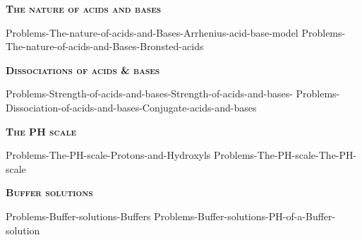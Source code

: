 \documentclass[main.tex]{subfiles}
\newcommand\chapterlabel{Ch-acidbase}
\begin{document}
\newpage
 
\fancyhfoffset[E,O]{0pt}
\setlength{\columnsep}{30pt}
\begin{conclusion}
\end{conclusion}
\begin{multicols*}{2}\setcounter{numA}{1}
{\raggedright\textsc{\textbf{The nature of acids and bases}}\par}
 {Problems-The-nature-of-acids-and-Bases-Arrhenius-acid-base-model}
 {Problems-The-nature-of-acids-and-Bases-Bronsted-acids}
 
 \iftoggle{chem121}{}{
 {Problems-The-nature-of-acids-and-Bases-Lewis-acid-base-model}
}
{\raggedright\textsc{\textbf{Dissociations of acids \& bases}}\par}
 {Problems-Strength-of-acids-and-bases-Strength-of-acids-and-bases-}
 {Problems-Dissociation-of-acids-and-bases-Conjugate-acids-and-bases}
 
{\raggedright\textsc{\textbf{The PH scale}}\par}
 {Problems-The-PH-scale-Protons-and-Hydroxyls}
 {Problems-The-PH-scale-The-PH-scale}
 
 \iftoggle{chem121}{}{
  {\raggedright\textsc{\textbf{PH of strong acid-base solutions}}\par}
 {Problems-The-PH-scale-PH-of-strong-electrolyte-solutions} 

 
 {\raggedright\textsc{\textbf{PH of weak acid-base solutions}}\par}
 {Problems-The-PH-scale-PH-of-solutions-of-weak-acids-and-bases} 
 {Problems-The-PH-scale-PH-of-solutions-of-weak-acids-and-bases-Solutions-of-acids-and-bases} 
}	


{\raggedright\textsc{\textbf{Buffer solutions}}\par}
 {Problems-Buffer-solutions-Buffers}
  {Problems-Buffer-solutions-PH-of-a-Buffer-solution}
  

\end{multicols*}
\end{document}
